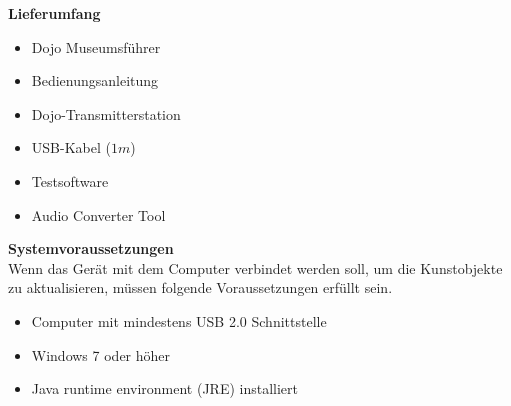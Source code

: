 \textbf{Lieferumfang}

\begin{itemize}
\item Dojo Museumsführer
\end{itemize}
\begin{itemize}
\item Bedienungsanleitung
\end{itemize}
\begin{itemize}
\item Dojo-Transmitterstation
\end{itemize}
\begin{itemize}
\item USB-Kabel ($1m$)
\end{itemize}
\begin{itemize}
\item Testsoftware
\end{itemize}
\begin{itemize}
\item Audio Converter Tool
\end{itemize}
\textbf{Systemvoraussetzungen}
\\[4mm]
Wenn das Gerät mit dem Computer verbindet werden soll, um die Kunstobjekte zu aktualisieren, müssen folgende Voraussetzungen erfüllt sein.
\begin{itemize}
\item Computer mit mindestens USB 2.0 Schnittstelle
\end{itemize}
\begin{itemize}
\item Windows 7 oder höher
\end{itemize}
\begin{itemize}
\item Java runtime environment (JRE) installiert
\end{itemize}